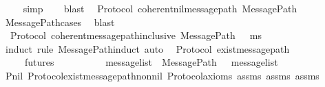 \begin{isabellebody}
\ \ \ \isamarkupfalse%
\ simp\isanewline
\ \ \isamarkupfalse%
\ blast%
\endisatagproof
{\isafoldproof}%
%
\isadelimproof
\isanewline
%
\endisadelimproof
\isanewline
{}\isamarkupfalse%
\ {\isacharparenleft}\ Protocol{\isacharparenright}\ coherent{\isacharunderscore}nil{\isacharunderscore}message{\isacharunderscore}path{\isacharcolon}\ {\isachardoublequoteopen}MessagePath\ {\isasymsigma}\ {\isasymsigma}{\isacharprime}\ {\isacharbrackleft}{\isacharbrackright}\ {\isasymLongrightarrow}\ {\isasymsigma}\ {\isacharequal}\ {\isasymsigma}{\isacharprime}{\isachardoublequoteclose}\isanewline
%
\isadelimproof
\ \ %
\endisadelimproof
%
\isatagproof
{}\isamarkupfalse%
\ MessagePath{\isachardot}cases\ \isamarkupfalse%
\ blast%
\endisatagproof
{\isafoldproof}%
%
\isadelimproof
\isanewline
%
\endisadelimproof
\isanewline
{}\isamarkupfalse%
\ {\isacharparenleft}\ Protocol{\isacharparenright}\ coherent{\isacharunderscore}message{\isacharunderscore}path{\isacharunderscore}inclusive{\isacharcolon}\ {\isachardoublequoteopen}MessagePath\ {\isasymsigma}\ {\isasymsigma}{\isacharprime}\ ms\ {\isasymLongrightarrow}\ {\isasymsigma}\ {\isasymsubseteq}\ {\isasymsigma}{\isacharprime}{\isachardoublequoteclose}\isanewline
%
\isadelimproof
\ \ %
\endisadelimproof
%
\isatagproof
{}\isamarkupfalse%
\ {\isacharparenleft}induct\ rule{\isacharcolon}\ MessagePath{\isachardot}induct{\isacharcomma}\ auto{\isacharparenright}%
\endisatagproof
{\isafoldproof}%
%
\isadelimproof
\isanewline
%
\endisadelimproof
\isanewline
{}\isamarkupfalse%
\ {\isacharparenleft}\ Protocol{\isacharparenright}\ exist{\isacharunderscore}message{\isacharunderscore}path{\isacharcolon}\isanewline
\ \ \ {\isachardoublequoteopen}{\isasymsigma}{\isacharprime}\ {\isasymin}\ futures\ {\isasymsigma}{\isachardoublequoteclose}\ {\isachardoublequoteopen}{\isasymsigma}\ {\isasymin}\ {\isasymSigma}{\isachardoublequoteclose}\ {\isachardoublequoteopen}{\isasymsigma}{\isacharprime}\ {\isasymin}\ {\isasymSigma}{\isachardoublequoteclose}\isanewline
\ \ \ message{\isacharunderscore}list\ \ {\isachardoublequoteopen}MessagePath\ {\isasymsigma}\ {\isasymsigma}{\isacharprime}\ message{\isacharunderscore}list{\isachardoublequoteclose}\isanewline
%
\isadelimproof
\ \ %
\endisadelimproof
%
\isatagproof
{}\isamarkupfalse%
\ P{\isacharunderscore}nil\ Protocol{\isachardot}exist{\isacharunderscore}message{\isacharunderscore}path{\isacharunderscore}nonnil\ Protocol{\isacharunderscore}axioms\ assms{\isacharparenleft}{}{\isacharparenright}\ assms{\isacharparenleft}{}{\isacharparenright}\ assms{\isacharparenleft}{}{\isacharparenright}\ \isamarkupfalse%

\end{isabellebody}
